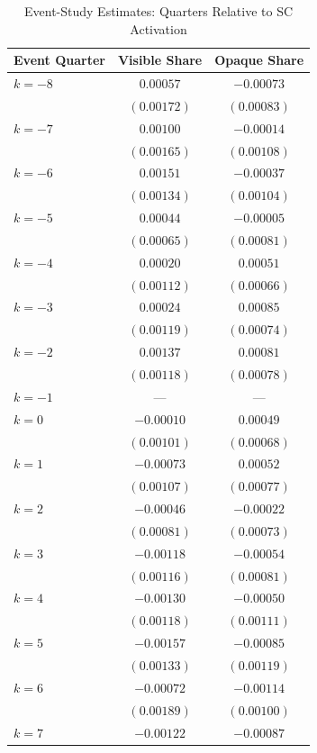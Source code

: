 \begin{table}[!htbp]
\centering
\small
\begin{threeparttable}
\caption{Event-Study Estimates: Quarters Relative to SC Activation}
\label{tab:eventstudy}
\begin{tabular}{lcc}
\toprule
Event Quarter & Visible Share & Opaque Share \\
\midrule
$k = -8$ & $0.00057$ & $-0.00073$ \\
 & $(0.00172)$ & $(0.00083)$ \\
$k = -7$ & $0.00100$ & $-0.00014$ \\
 & $(0.00165)$ & $(0.00108)$ \\
$k = -6$ & $0.00151$ & $-0.00037$ \\
 & $(0.00134)$ & $(0.00104)$ \\
$k = -5$ & $0.00044$ & $-0.00005$ \\
 & $(0.00065)$ & $(0.00081)$ \\
$k = -4$ & $0.00020$ & $0.00051$ \\
 & $(0.00112)$ & $(0.00066)$ \\
$k = -3$ & $0.00024$ & $0.00085$ \\
 & $(0.00119)$ & $(0.00074)$ \\
$k = -2$ & $0.00137$ & $0.00081$ \\
 & $(0.00118)$ & $(0.00078)$ \\
$k = -1$ & --- & --- \\
\midrule
$k = 0$ & $-0.00010$ & $0.00049$ \\
 & $(0.00101)$ & $(0.00068)$ \\
$k = 1$ & $-0.00073$ & $0.00052$ \\
 & $(0.00107)$ & $(0.00077)$ \\
$k = 2$ & $-0.00046$ & $-0.00022$ \\
 & $(0.00081)$ & $(0.00073)$ \\
$k = 3$ & $-0.00118$ & $-0.00054$ \\
 & $(0.00116)$ & $(0.00081)$ \\
$k = 4$ & $-0.00130$ & $-0.00050$ \\
 & $(0.00118)$ & $(0.00111)$ \\
$k = 5$ & $-0.00157$ & $-0.00085$ \\
 & $(0.00133)$ & $(0.00119)$ \\
$k = 6$ & $-0.00072$ & $-0.00114$ \\
 & $(0.00189)$ & $(0.00100)$ \\
$k = 7$ & $-0.00122$ & $-0.00087$ \\

\end{tabular}
\end{threeparttable}
\end{table}
